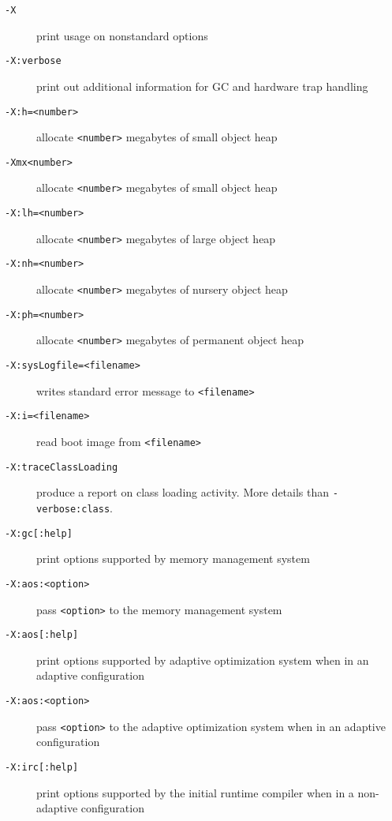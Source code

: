 \begin{description}
\item [{\tt -X}]
print usage on nonstandard options

\item[{\tt -X:verbose}]
print out additional information for GC and hardware trap handling

\item[{\tt -X:h=<number>}]
allocate {\tt <number>} megabytes of small object heap

\item[{\tt -Xmx<number>}]
allocate {\tt <number>} megabytes of small object heap

\item[{\tt -X:lh=<number>}]
allocate {\tt <number>} megabytes of large object heap

\item[{\tt -X:nh=<number>}]
allocate {\tt <number>} megabytes of nursery object heap 

\item[{\tt -X:ph=<number>}]
allocate {\tt <number>} megabytes of permanent object heap 

\item[{\tt -X:sysLogfile=<filename>}]
writes standard error message to {\tt <filename>}

\item[{\tt -X:i=<filename>}]
read boot image from {\tt <filename>}

\item[{\tt -X:traceClassLoading}]
produce a report on class loading activity. More details than 
{\tt -verbose:class}. 

\item[{\tt -X:gc[:help]}]
print options supported by memory management system

\item[{\tt -X:aos:<option>}]
pass {\tt <option>} to the memory management system

\item[{\tt -X:aos[:help]}]
print options supported by adaptive optimization system when in an
adaptive configuration

\item[{\tt -X:aos:<option>}]
pass {\tt <option>} to the adaptive optimization system when in an adaptive configuration

\item[{\tt -X:irc[:help]}]
print options supported by the initial runtime compiler when in a non-adaptive
configuration 


\end{description}
